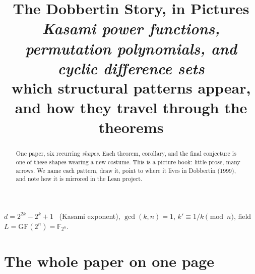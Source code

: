 \documentclass[11pt]{article}
\title{\bf The Dobbertin Story, in Pictures\\[3pt]
  \large \emph{Kasami power functions, permutation polynomials, and cyclic difference sets}\\[2pt]
  \normalsize which structural patterns appear, and how they travel through the theorems}
\author{}
\date{}
\begin{document}
\maketitle

\begin{abstract}\noindent
One paper, six recurring \emph{shapes}. Each theorem, corollary, and the final
conjecture is one of these shapes wearing a new costume. This is a picture book:
little prose, many arrows. We name each pattern, draw it, point to where it lives
in Dobbertin (1999), and note how it is mirrored in the Lean project.
\end{abstract}

\begin{center}\small
$d = 2^{2k}-2^{k}+1$ \ (Kasami exponent), \quad $\gcd(k,n)=1$, \quad
$k'\equiv 1/k \pmod n$, \quad field $L=\mathrm{GF}(2^n)=\mathbb{F}_{2^n}$.
\end{center}

\section*{The whole paper on one page}
\end{document}
